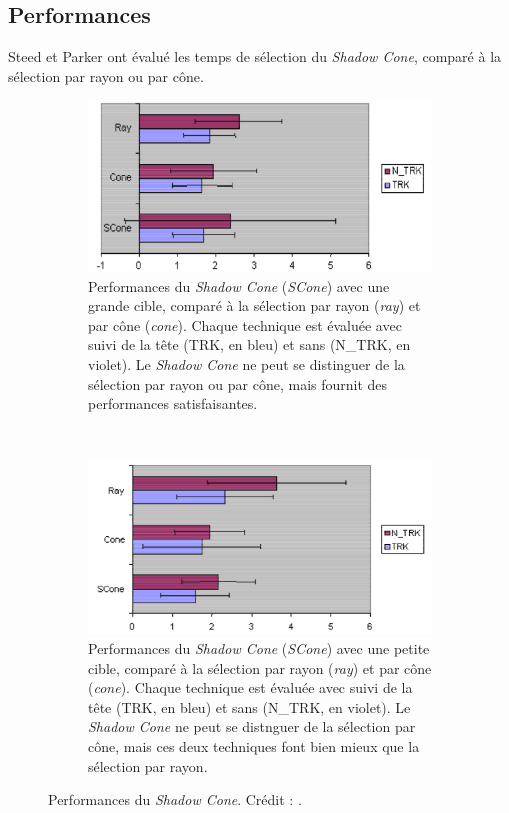 	\subsection{Performances}
	Steed et Parker ont évalué les temps de sélection du \emph{Shadow Cone}, comparé à la sélection par rayon ou par cône.

	\begin{figure}[!htb]
		\begin{subfigure}[t]{0.49\textwidth}
			\centering
			\includegraphics[width=\textwidth]{figures/ch2/shadowSLarge}
			\caption{Performances du \emph{Shadow Cone} (\emph{SCone}) avec une grande cible, comparé à la sélection par rayon (\emph{ray}) et par cône (\emph{cone}). Chaque technique est évaluée avec suivi de la tête (TRK, en bleu) et sans (N\_{}TRK, en violet). Le \emph{Shadow Cone} ne peut se distinguer de la sélection par rayon ou par cône, mais fournit des performances satisfaisantes.}
			\label{fig:shadowSLarge}
		\end{subfigure}
		~
		\begin{subfigure}[t]{0.49\textwidth}
			\centering
			\includegraphics[width=\textwidth]{figures/ch2/shadowSSmall}
			\caption{Performances du \emph{Shadow Cone} (\emph{SCone}) avec une petite cible, comparé à la sélection par rayon (\emph{ray}) et par cône (\emph{cone}). Chaque technique est évaluée avec suivi de la tête (TRK, en bleu) et sans (N\_{}TRK, en violet). Le \emph{Shadow Cone} ne peut se distnguer de la sélection par cône, mais ces deux techniques font bien mieux que la sélection par rayon.}
			\label{fig:shadowSSmall}
		\end{subfigure}
		\caption[Performances du \emph{Shadow Cone}]{Performances du \emph{Shadow Cone}. Crédit : \cite{steed20043d}.}
		\label{fig:shadowConePerf}
	\end{figure}
	
